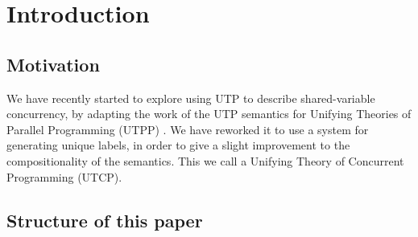 \section{Introduction}\label{sec:Intro}

\subsection{Motivation}


We have recently started to explore using UTP
to describe shared-variable concurrency,
by adapting the work of the  UTP semantics for Unifying Theories
of Parallel Programming (UTPP) \cite{DBLP:conf/icfem/WoodcockH02}.
We have reworked it to use a system for generating unique labels,
in order to give a slight improvement to the compositionality
of the semantics.
This we call a Unifying Theory of Concurrent Programming (UTCP)\cite{conf/tase/BMN16}.


\subsection{Structure of this paper}
